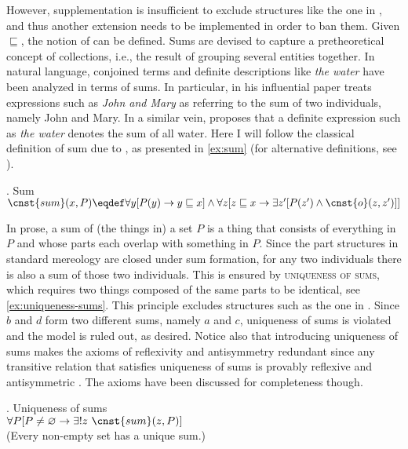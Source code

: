 However, supplementation is insufficient to exclude structures like the one in , and thus another extension needs to be implemented in order to ban them. Given $\sqsubseteq$, the notion of  can be defined. Sums are devised to capture a pretheoretical concept of collections, i.e., the result of grouping several entities together. In natural language, conjoined terms and definite descriptions like \textit{the water} have been analyzed in terms of sums. In particular, in his influential paper \citet{link1983logical} treats expressions such as \textit{John and Mary} as referring to the sum of two individuals, namely John and Mary. In a similar vein, \citet{sharvy1980more} proposes that a definite expression such as \textit{the water} denotes the sum of all water. Here I will follow the classical definition of sum due to \citet{tarski1929fondements}, as presented in \ref{ex:sum} (for alternative definitions, see \citealt{simons1987parts,casati_varzi1999parts}).

\ex. Sum\label{ex:sum} \citep[p. 517; adapted]{champollion_krifka2016mereology}\\
$\cnst{sum}(x,P) \eqdef \forall y[P(y) \rightarrow y \sqsubseteq x] \wedge  \forall z[z \sqsubseteq x \rightarrow \exists z'[P(z') \wedge \cnst{o}(z,z')]]$

In prose, a sum of (the things in) a set $P$ is a thing that consists of everything in $P$ and whose parts each overlap with something in $P$. Since the part structures in standard mereology are closed under sum formation, for any two individuals there is also a sum of those two individuals. This is ensured by \textsc{uniqueness of sums}, which requires two things composed of the same parts to be identical, see \ref{ex:uniqueness-sums}. This principle excludes structures such as the one in . Since $b$ and $d$ form two different sums, namely $a$ and $c$, uniqueness of sums is violated and the model is ruled out, as desired. Notice also that introducing uniqueness of sums makes the axioms of reflexivity and antisymmetry redundant since any transitive relation that satisfies uniqueness of sums is provably reflexive and antisymmetric \citep[see][]{hovda2009classical,champollion2017parts}. The axioms have been discussed for completeness though.

\ex. Uniqueness of sums \citep[p. 517; adapted]{champollion_krifka2016mereology}\label{ex:uniqueness-sums}\\
$\forall P[P \neq \varnothing \rightarrow \exists !z\ \cnst{sum}(z,P)]$\\
(Every non-empty set has a unique sum.)

